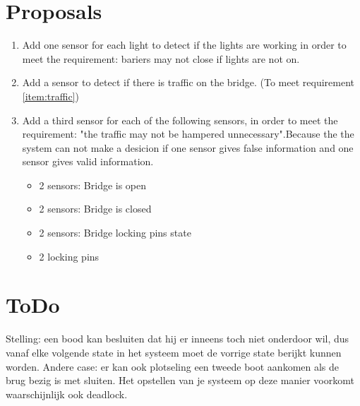 \documentclass[a4paper]{article}
\begin{document}

\section{Proposals}
\label{sec:proposals}

\begin{enumerate}
\item{Add one sensor for each light to detect if the lights are working in order to meet the requirement: bariers may not close if lights are not on.}

\item{Add a sensor to detect if there is traffic on the bridge. (To meet requirement \ref{item:traffic})}

\item{Add a third sensor for each of the following sensors, in order to meet the requirement: "the traffic may not be hampered unnecessary".Because the the system can not make a desicion if one sensor gives false information and one sensor gives valid information.}
\begin{itemize}
\item{2 sensors: Bridge is open}
\item{2 sensors: Bridge is closed}
\item{2 sensors: Bridge locking pins state}
\item{2 locking pins}
\end{itemize}
\end{enumerate}




\section{ToDo}

Stelling: een bood kan besluiten dat hij er inneens toch niet onderdoor wil, dus vanaf elke volgende state in het systeem moet de vorrige state berijkt kunnen worden. 
Andere case: er kan ook plotseling een tweede boot aankomen als de brug bezig is met sluiten. 
Het opstellen van je systeem op deze manier voorkomt waarschijnlijk ook deadlock. 

\end{document}
